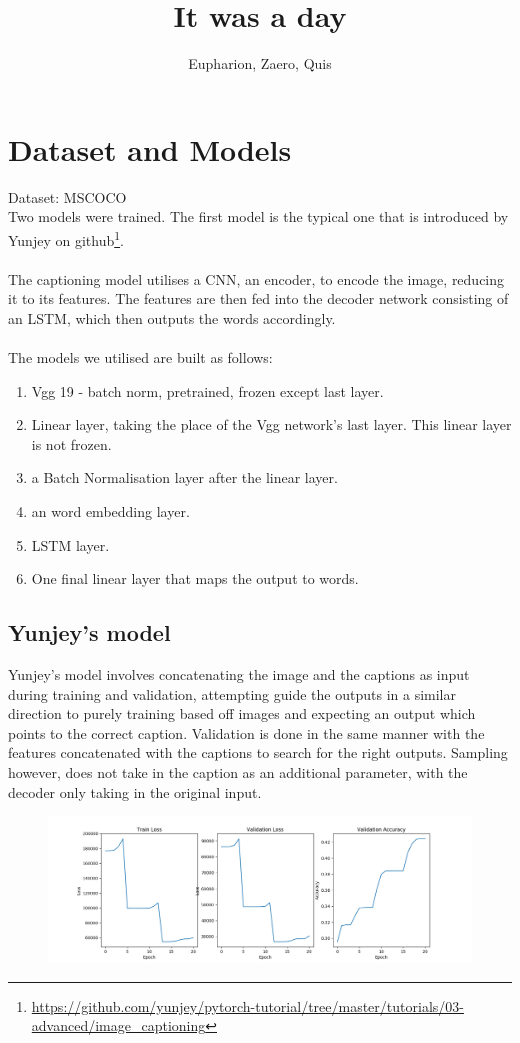 \documentclass{proc}
\author{Eupharion, Zaero, Quis}
\title{It was a day}
\begin{document}
\maketitle
\section{Dataset and Models}
Dataset: MSCOCO\\
Two models were trained. The first model is the typical one that is introduced by Yunjey on github\footnote{\url{https://github.com/yunjey/pytorch-tutorial/tree/master/tutorials/03-advanced/image_captioning}}. 
\paragraph{} The captioning model utilises a CNN, an encoder, to encode the image, reducing it to its features. The features are then fed into the decoder network consisting of an LSTM, which then outputs the words accordingly.
\paragraph{} The models we utilised are built as follows:
\begin{enumerate}
\item Vgg 19 - batch norm, pretrained, frozen except last layer.
\item Linear layer, taking the place of the Vgg network's last layer. This linear layer is not frozen.
\item a Batch Normalisation layer after the linear layer.
\item an word embedding layer.
\item LSTM layer.
\item One final linear layer that maps the output to words.
\end{enumerate}

\subsection{Yunjey's model}
Yunjey's model involves concatenating the image and the captions as input during training and validation, attempting guide the outputs in a similar direction to purely training based off images and expecting an output which points to the correct caption. Validation is done in the same manner with the features concatenated with the captions to search for the right outputs. Sampling however, does not take in the caption as an additional parameter, with the decoder only taking in the original input.\\
\begin{figure}[h!]
  \includegraphics[width=\linewidth]{image_n_cap.png}
\end{figure}
\end{document}
